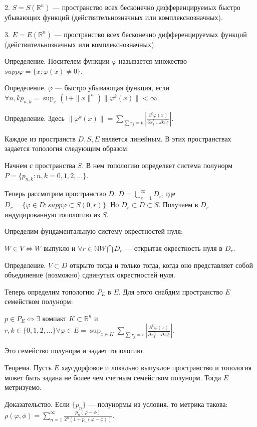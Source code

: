 \documentclass[12pt,titlepage, a4paper]{article}
\begin{document}
2. $S=S(\mathbb{R}^n)$ --- пространство всех бесконечно
дифференцируемых быстро убывающих функций (действительнозначных
или комплекснозначных).

3. $E=E(\mathbb{R}^n)$ --- пространство всех бесконечно
дифференцируемых функций (действительнозначных или
комплекснозначных).

Определение. Носителем функции $\varphi$ называется множество
$supp\varphi=\overline{\{x: \varphi(x)\neq0\}}$.

Определение. $\varphi$ --- быстро убывающая функция, если $\forall
n,k  p_{n,k}=\sup_x(1+\|x\|^n)\|\varphi^k(x)\|<\infty$.

Определение. Здесь $\|\varphi^k(x)\|=\sum_{\sum
r_j=k}|\frac{\partial^k\varphi(x)}{\partial x^{r_1}_{1 } \ldots
\partial  x^{r_n}_{n }}|$.

Каждое из пространств $D, S, E$ является линейным. В этих
пространствах задается топология следующим образом.

Начнем с пространства $S$. В нем топологию определяет система
полунорм $P=\{p_{n,k}: n,k=0,1,2,\ldots\}$.

Теперь рассмотрим пространство $D$. $D=\bigcup_{r=1}^{\infty}D_r$,
где $D_{r}=\{\varphi\in D: supp \varphi\subset S(0,r)\}$. Но $D_r
\subset D\subset S$. Получаем в $D_r$ индуцированную топологию из
$S$.

Определим фундаментальную систему окрестностей нуля:

$W\in V \Longleftrightarrow W $ выпукло и $\forall r\in \mathbb{N}
W\bigcap D_r$ --- открытая окрестность нуля в $D_r$.

Определение. $V\subset D$ открыто тогда и только тогда, когда оно
представляет собой объединение (возможно) сдвинутых окрестностей
нуля.

Теперь определим топологию $P_E$ в $E$. Для этого снабдим
пространство $E$ семейством полунорм:

$p\in P_E \Longleftrightarrow \exists$ компакт $K\subset
\mathbb{R}^n$ и $r,k\in \{0,1,2,\ldots\} \forall \varphi \in
E=\sup_{x\in K}\sum_{\sum
r_j=r}|\frac{\partial^k\varphi(x)}{\partial x^{r_1}_{1 } \ldots
\partial  x^{r_n}_{n }}|$.

Это семейство полунорм и задает топологию.

Теорема. Пусть $E$ хаусдорфовое и локально выпуклое пространство и
топология может быть задана не более чем счетным семейством
полунорм. Тогда $E$ метризуемо.

Доказательство. Если $\{p_n\}$ --- полунормы из условия, то
метрика такова:
$\rho(\varphi,\phi)=\sum_{n=1}^{\infty}\frac{p_n(\varphi-\phi)}{2^n(1+p_n(\varphi-\phi))}$.
\end{document}
